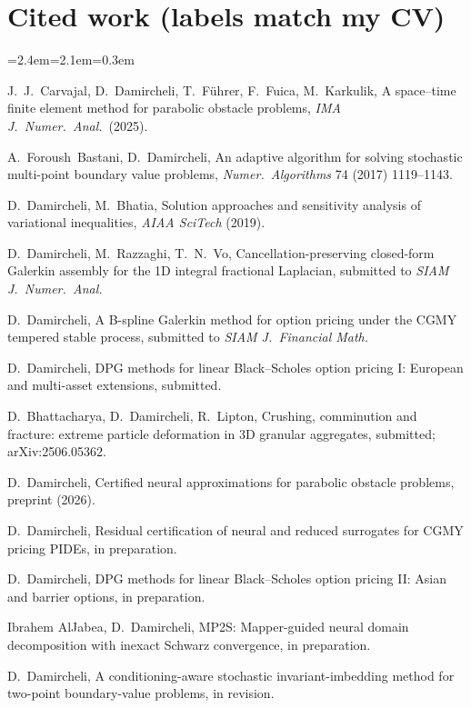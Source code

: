 \documentclass[11pt]{article}
\newcommand{\rc}[1]{\textcolor{accent}{[#1]}}
\begin{document}
\section*{Cited work {\normalfont\small(labels match my CV)}}
{\footnotesize
\setlength{\parskip}{0pt}
\begin{list}{}{\leftmargin=2.4em=2.1em=0.3em\itemsep=0pt\parsep=0pt}
\item[\rc{J2}] J.~J.~Carvajal, D.~Damircheli, T.~F\"uhrer, F.~Fuica, M.~Karkulik, A space--time finite element method for parabolic obstacle problems, \emph{IMA J.\ Numer.\ Anal.}\ (2025).
\item[\rc{J6}] A.~Foroush~Bastani, D.~Damircheli, An adaptive algorithm for solving stochastic multi-point boundary value problems, \emph{Numer.\ Algorithms} 74 (2017) 1119--1143.
\item[\rc{C1}] D.~Damircheli, M.~Bhatia, Solution approaches and sensitivity analysis of variational inequalities, \emph{AIAA SciTech} (2019).
\item[\rc{S1}] D.~Damircheli, M.~Razzaghi, T.~N.~Vo, Cancellation-preserving closed-form Galerkin assembly for the 1D integral fractional Laplacian, submitted to \emph{SIAM J.\ Numer.\ Anal.}
\item[\rc{S2}] D.~Damircheli, A B-spline Galerkin method for option pricing under the CGMY tempered stable process, submitted to \emph{SIAM J.\ Financial Math.}
\item[\rc{S3}] D.~Damircheli, DPG methods for linear Black--Scholes option pricing I: European and multi-asset extensions, submitted.
\item[\rc{S5}] D.~Bhattacharya, D.~Damircheli, R.~Lipton, Crushing, comminution and fracture: extreme particle deformation in 3D granular aggregates, submitted; arXiv:2506.05362.
\item[\rc{P1}] D.~Damircheli, Certified neural approximations for parabolic obstacle problems, preprint (2026).
\item[\rc{M1}] D.~Damircheli, Residual certification of neural and reduced surrogates for CGMY pricing PIDEs, in preparation.
\item[\rc{M2}] D.~Damircheli, DPG methods for linear Black--Scholes option pricing II: Asian and barrier options, in preparation.
\item[\rc{M3}] Ibrahem AlJabea, D.~Damircheli, MP2S: Mapper-guided neural domain decomposition with inexact Schwarz convergence, in preparation. %
\item[\rc{M4}] D.~Damircheli, A conditioning-aware stochastic invariant-imbedding method for two-point boundary-value problems, in revision. %
\end{list}
}
\end{document}
